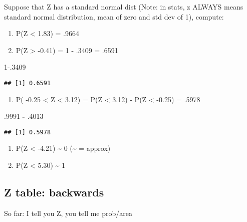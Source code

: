\documentclass[]{article}
\newenvironment{Shaded}{\begin{snugshade}}{\end{snugshade}}
\newcommand{\DecValTok}[1]{\textcolor[rgb]{0.00,0.00,0.81}{#1}}
\newcommand{\FloatTok}[1]{\textcolor[rgb]{0.00,0.00,0.81}{#1}}
\newcommand{\OperatorTok}[1]{\textcolor[rgb]{0.81,0.36,0.00}{\textbf{#1}}}
\newcommand{\StringTok}[1]{\textcolor[rgb]{0.31,0.60,0.02}{#1}}
\providecommand{\tightlist}{%
  \setlength{\itemsep}{0pt}\setlength{\parskip}{0pt}}
\begin{document}
Suppose that Z has a standard normal dist (Note: in stats, z ALWAYS
means standard normal distribution, mean of zero and std dev of 1),
compute:

\begin{enumerate}
\def\labelenumi{\alph{enumi})}
\item
  P(Z \textless{} 1.83) = .9664
\item
  P(Z \textgreater{} -0.41) = 1 - .3409 = .6591
\end{enumerate}

\begin{Shaded}
\begin{Highlighting}[]
\DecValTok{1}\FloatTok{-.3409}
\end{Highlighting}
\end{Shaded}

\begin{verbatim}
## [1] 0.6591
\end{verbatim}

\begin{enumerate}
\def\labelenumi{\alph{enumi})}
\setcounter{enumi}{2}
\tightlist
\item
  P( -0.25 \textless{} Z \textless{} 3.12) = P(Z \textless{} 3.12) - P(Z
  \textless{} -0.25) = .5978
\end{enumerate}

\begin{Shaded}
\begin{Highlighting}[]
\FloatTok{.9991} \OperatorTok{-}\StringTok{ }\FloatTok{.4013}
\end{Highlighting}
\end{Shaded}

\begin{verbatim}
## [1] 0.5978
\end{verbatim}

\begin{enumerate}
\def\labelenumi{\alph{enumi})}
\setcounter{enumi}{3}
\item
  P(Z \textless{} -4.21) \textasciitilde{} 0 (\textasciitilde{} =
  approx)
\item
  P(Z \textless{} 5.30) \textasciitilde{} 1
\end{enumerate}

\hypertarget{z-table-backwards-1}{%
\subsection{Z table: backwards}\label{z-table-backwards-1}}

So far: I tell you Z, you tell me prob/area
\end{document}
